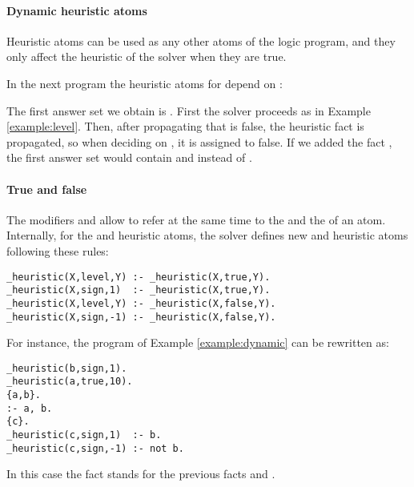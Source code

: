 \paragraph{Dynamic heuristic atoms}

Heuristic atoms can be used as any other atoms of the logic program,
and they only affect the heuristic of the solver when they are true.
\begin{example}
\label{example:dynamic}
In the next program the heuristic atoms for  depend on :

The first answer set we obtain 
is .
First the solver proceeds as in Example \ref{example:level}.
Then, after propagating that  is false,  
the heuristic fact  is propagated,
so when deciding on , it is assigned to false.  
If we added the fact ,
the first answer set would contain  and  instead of .
\eexample
\end{example}

\paragraph{True and false}

 The modifiers  and  allow to refer at the same time to the  and the  of an atom.
 Internally,  for the  and  heuristic atoms,
 the solver defines new  and  heuristic atoms following these rules:
\begin{lstlisting}[numbers=none]
_heuristic(X,level,Y) :- _heuristic(X,true,Y).
_heuristic(X,sign,1)  :- _heuristic(X,true,Y).
_heuristic(X,level,Y) :- _heuristic(X,false,Y).
_heuristic(X,sign,-1) :- _heuristic(X,false,Y).
\end{lstlisting}
For instance, the program of Example \ref{example:dynamic}
can be rewritten as:
\begin{lstlisting}[numbers=none]
_heuristic(b,sign,1).
_heuristic(a,true,10).
{a,b}.
:- a, b.
{c}.
_heuristic(c,sign,1)  :- b.
_heuristic(c,sign,-1) :- not b.
\end{lstlisting}
In this case the fact  stands for the previous
facts  and .


